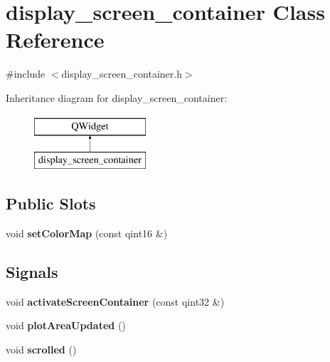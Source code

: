 \hypertarget{classdisplay__screen__container}{}\section{display\+\_\+screen\+\_\+container Class Reference}
\label{classdisplay__screen__container}


{\ttfamily \#include $<$display\+\_\+screen\+\_\+container.\+h$>$}

Inheritance diagram for display\+\_\+screen\+\_\+container\+:\begin{figure}[H]
\begin{center}
\leavevmode
\includegraphics[height=2.000000cm]{classdisplay__screen__container}
\end{center}
\end{figure}
\subsection*{Public Slots}
\begin{DoxyCompactItemize}
\item 
\mbox{\label{classdisplay__screen__container_ad136b303dffb379e6f34eebed05e0915}} 
void {\bfseries set\+Color\+Map} (const qint16 \&)
\end{DoxyCompactItemize}
\subsection*{Signals}
\begin{DoxyCompactItemize}
\item 
\mbox{\label{classdisplay__screen__container_afadf19fd35f800a7ba622fa6023b5e36}} 
void {\bfseries activate\+Screen\+Container} (const qint32 \&)
\item 
\mbox{\label{classdisplay__screen__container_a7266b7910994b761c0ab8b772cdd8248}} 
void {\bfseries plot\+Area\+Updated} ()
\item 
\mbox{\label{classdisplay__screen__container_a2145ded890fea1868ffbdc076a25eb64}} 
void {\bfseries scrolled} ()
\end{DoxyCompactItemize}

